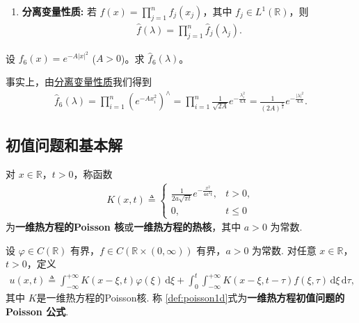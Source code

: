 \documentclass[../../main.tex]{subfiles}%
\begin{document}
\begin{proposition}
\begin{enumerate}[(1)]
\item\label{proposition:Fourier 变换的基本性质2-8} \textbf{分离变量性质:} 若 $f(x)=\prod_{j=1}^n f_j(x_j)$，其中 $f_j\in L^1(\mathbb{R})$，则
\begin{align*}
\hat{f}(\lambda)=\prod_{j=1}^n \hat{f}_j(\lambda_j).
\end{align*}
\end{enumerate}
\end{proposition}

\begin{example}
设 $f_6(x)=e^{-A|x|^2}$ ($A>0$)。求 $\hat{f}_6(\lambda)$。
\end{example}
\begin{solution}
事实上，由\hyperref[proposition:Fourier 变换的基本性质2-8]{分离变量性质}我们得到
\begin{align*}
\hat{f}_6(\lambda)=\prod_{i=1}^{n}(e^{-Ax_i^2})^\wedge=\prod_{i=1}^{n}\frac{1}{\sqrt{2A}}e^{-\frac{\lambda_i^2}{4A}}=\frac{1}{(2A)^{\frac{n}{2}}}e^{-\frac{|\lambda|^2}{4A}}.
\end{align*}
\end{solution}

\subsection{初值问题和基本解}

\begin{definition}
对 $x\in\mathbb{R}$，$t>0$，称函数
\begin{align*}
K(x,t)\triangleq \begin{cases}
\frac{1}{2a\sqrt{\pi t}}e^{-\frac{x^2}{4a^2t}}, & t>0,\\
0, & t\leqslant 0
\end{cases} 
\end{align*}
为\textbf{一维热方程的Poisson 核}或\textbf{一维热方程的热核}，其中 $a>0$ 为常数.
\end{definition}

\begin{definition}
设 $\varphi\in C(\mathbb{R})$ 有界，$f\in C(\mathbb{R}\times(0,\infty))$ 有界，$a>0$ 为常数. 对任意 $x\in\mathbb{R}$，$t>0$，定义
\begin{align}
u(x,t)\triangleq \int_{-\infty}^{+\infty}K(x-\xi,t)\varphi(\xi)\,\mathrm{d}\xi
+\int_0^t\int_{-\infty}^{+\infty}K(x-\xi,t-\tau)f(\xi,\tau)\,\mathrm{d}\xi\,\mathrm{d}\tau, \label{def:poisson1d}
\end{align}
其中 $K$是一维热方程的Poisson核. 称 \eqref{def:poisson1d}式为\textbf{一维热方程初值问题的Poisson 公式}.
\end{definition}
\end{document}
